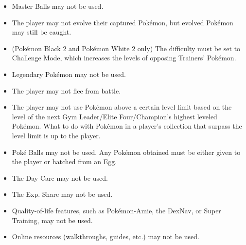 \documentclass{article}
\begin{document}
\begin{itemize}
				\item
					Master Balls may not be used.
				\item
					The player may not evolve their captured Pokémon, but evolved Pokémon may still be caught.
				\item
					(Pokémon Black 2 and Pokémon White 2 only) The difficulty must be set to Challenge Mode, which increases the levels of opposing Trainers' Pokémon.
				\item
					Legendary Pokémon may not be used.
				\item
					The player may not flee from battle.
				\item
					The player may not use Pokémon above a certain level limit based on the level of the next Gym Leader/Elite Four/Champion's highest leveled Pokémon. What to do with Pokémon in a player's collection that surpass the level limit is up to the player.
				\item
					Poké Balls may not be used. Any Pokémon obtained must be either given to the player or hatched from an Egg.
				\item
					The Day Care may not be used.
				\item
					The Exp. Share may not be used.
				\item
					Quality-of-life features, such as Pokémon-Amie, the DexNav, or Super Training, may not be used.
				\item
					Online resources (walkthroughs, guides, etc.) may not be used.
				\end{itemize}

\end{document}
